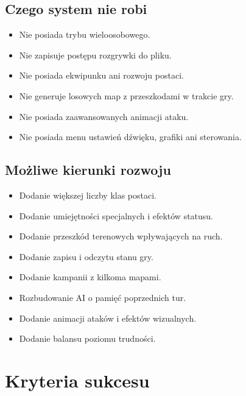 \documentclass[12pt,a4paper]{article}
\begin{document}
\subsection{Czego system nie robi}

\begin{itemize}
    \item Nie posiada trybu wieloosobowego.
    \item Nie zapisuje postępu rozgrywki do pliku.
    \item Nie posiada ekwipunku ani rozwoju postaci.
    \item Nie generuje losowych map z przeszkodami w trakcie gry.
    \item Nie posiada zaawansowanych animacji ataku.
    \item Nie posiada menu ustawień dźwięku, grafiki ani sterowania.
\end{itemize}

\subsection{Możliwe kierunki rozwoju}

\begin{itemize}
    \item Dodanie większej liczby klas postaci.
    \item Dodanie umiejętności specjalnych i efektów statusu.
    \item Dodanie przeszkód terenowych wpływających na ruch.
    \item Dodanie zapisu i odczytu stanu gry.
    \item Dodanie kampanii z kilkoma mapami.
    \item Rozbudowanie AI o pamięć poprzednich tur.
    \item Dodanie animacji ataków i efektów wizualnych.
    \item Dodanie balansu poziomu trudności.
\end{itemize}

\newpage

\section{Kryteria sukcesu}
\end{document}
